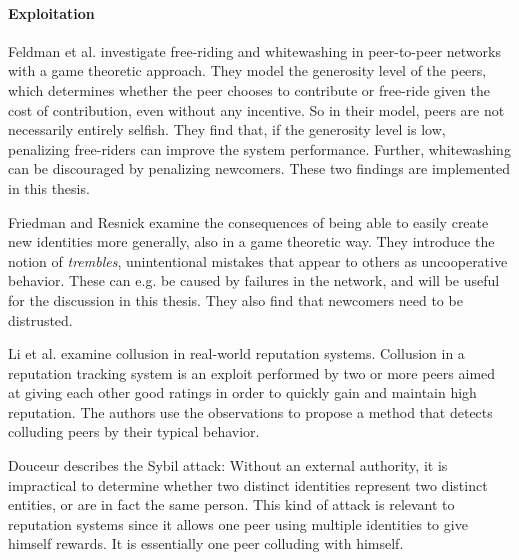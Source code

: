 \paragraph{Exploitation}
Feldman et al.\cite{feldman2006freeriding} investigate free-riding and
whitewashing in peer-to-peer networks with a game theoretic approach. They model
the generosity level of the peers, which determines whether the peer chooses to
contribute or free-ride given the cost of contribution, even without any
incentive. So in their model, peers are not necessarily entirely selfish. They
find that, if the generosity level is low, penalizing free-riders can improve
the system performance. Further, whitewashing can be discouraged by penalizing
newcomers. These two findings are implemented in this thesis.

Friedman and Resnick\cite{friedman2001social} examine the consequences of being
able to easily create new identities more generally, also in a game theoretic
way. They introduce the notion of \emph{trembles}, unintentional mistakes that
appear to others as uncooperative behavior. These can e.g. be caused by failures
in the network, and will be useful for the discussion in this thesis. They also
find that newcomers need to be distrusted.

Li et al.\cite{li2012collusion} examine collusion in real-world reputation
systems. Collusion in a reputation tracking system is an exploit performed by
two or more peers aimed at giving each other good ratings in order to quickly
gain and maintain high reputation.  The authors use the observations to propose
a method that detects colluding peers by their typical behavior.

Douceur\cite{douceur2002sybil} describes the Sybil attack: Without an external
authority, it is impractical to determine whether two distinct identities
represent two distinct entities, or are in fact the same person. This kind of
attack is relevant to reputation systems since it allows one peer using multiple
identities to give himself rewards. It is essentially one peer colluding with
himself.
